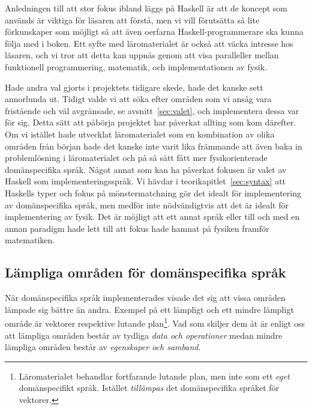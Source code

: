 Anledningen till att stor fokus ibland läggs på Haskell är att de
koncept som används är viktiga för läsaren att förstå, men vi vill
förutsätta så lite förkunskaper som möjligt så att även oerfarna
Haskell-programmerare ska kunna följa med i boken. Ett syfte med
läromaterialet är också att väcka intresse hos läsaren, och vi tror
att detta kan uppnås genom att visa paralleller mellan funktionell
programmering, matematik, och implementationen av fysik.

Hade andra val gjorts i projektets tidigare skede, hade det kanske
sett annorlunda ut. Tidigt valde vi att söka efter områden som vi
ansåg vara fristående och väl avgränsade, se avsnitt~\ref{sec:valet},
och implementera dessa var för sig. Detta sätt att påbörja projektet
har påverkat allting som kom därefter. Om vi istället hade utvecklat
läromaterialet som en kombination av olika områden från början hade
det kanske inte varit lika främmande att även baka in problemlösning i
läromaterialet och på så sätt fått mer fysikorienterade domänspecifika
språk. Något annat som kan ha påverkat fokusen är valet av Haskell som
implementeringsspråk. Vi hävdar i teorikapitlet~\ref{sec:syntax} att
Haskells typer och fokus på mönstermatchning gör det idealt för
implementering av domänspecifika språk, men medför inte nödvändigtvis
att det är idealt för implementering av fysik. Det är möjligt att ett
annat språk eller till och med en annan paradigm hade lett till att
fokus hade hamnat på fysiken framför matematiken.

\subsection{Lämpliga områden för domänspecifika språk}\label{sec:lampligt}

När domänspecifika språk implementerades visade det sig att vissa områden lämpade sig bättre än andra. Exempel på ett lämpligt och ett mindre lämpligt område är vektorer respektive lutande plan\footnote{Läromaterialet behandlar fortfarande lutande plan, men inte som ett \textit{eget} domänspecifikt språk. Istället \textit{tillämpas} det domänspecifika språket för vektorer.}. Vad som skiljer dem åt är enligt oss att lämpliga områden består av tydliga \textit{data och operationer} medan mindre lämpliga områden består av \textit{egenskaper och samband}.

